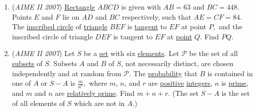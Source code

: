 \begin{enumerate}
 

	\item (\textit{AIME II 2007}) \href{https://artofproblemsolving.com/wiki/index.php?title=Rectangle}{Rectangle} $ABCD$ is given with $AB=63$ and $BC=448.$ Points $E$ and $F$ lie on $AD$ and $BC$ respectively, such that $AE=CF=84.$ The \href{https://artofproblemsolving.com/wiki/index.php?title=Inscribed\_circle}{inscribed circle} of \href{https://artofproblemsolving.com/wiki/index.php?title=Triangle}{triangle} $BEF$ is \href{https://artofproblemsolving.com/wiki/index.php?title=Tangent}{tangent} to $EF$ at point $P,$ and the inscribed circle of triangle $DEF$ is tangent to $EF$ at \href{https://artofproblemsolving.com/wiki/index.php?title=Point}{point} $Q.$ Find $PQ.$


	\item (\textit{AIME II 2007}) Let $S$ be a \href{https://artofproblemsolving.com/wiki/index.php?title=Set}{set} with six \href{https://artofproblemsolving.com/wiki/index.php?title=Element}{elements}. Let $\mathcal{P}$ be the set of all \href{https://artofproblemsolving.com/wiki/index.php?title=Subset}{subsets} of $S.$ Subsets $A$ and $B$ of $S$, not necessarily distinct, are chosen independently and at random from $\mathcal{P}$. The \href{https://artofproblemsolving.com/wiki/index.php?title=Probability}{probability} that $B$ is contained in one of $A$ or $S-A$ is $\frac{m}{n^{r}},$ where $m$, $n$, and $r$ are \href{https://artofproblemsolving.com/wiki/index.php?title=Positive}{positive} \href{https://artofproblemsolving.com/wiki/index.php?title=Integer}{integers}, $n$ is \href{https://artofproblemsolving.com/wiki/index.php?title=Prime}{prime}, and $m$ and $n$ are \href{https://artofproblemsolving.com/wiki/index.php?title=Relatively\_prime}{relatively prime}. Find $m+n+r.$ (The set $S-A$ is the set of all elements of $S$ which are not in $A.$)


 


\end{enumerate}
